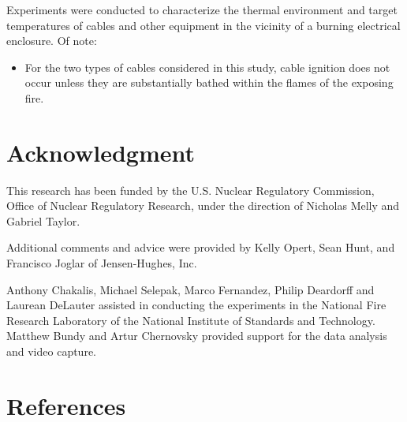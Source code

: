 Experiments were conducted to characterize the thermal environment and target temperatures of cables and other equipment in the vicinity of a burning electrical enclosure. Of note:
\begin{itemize}
\item For the two types of cables considered in this study, cable ignition does not occur unless they are substantially bathed within the flames of the exposing fire.
\end{itemize}



\section{Acknowledgment}

This research has been funded by the U.S. Nuclear Regulatory Commission, Office of Nuclear Regulatory Research, under the direction of Nicholas Melly and Gabriel Taylor.

Additional comments and advice were provided by Kelly Opert, Sean Hunt, and Francisco Joglar of Jensen-Hughes, Inc.

Anthony Chakalis, Michael Selepak, Marco Fernandez, Philip Deardorff and Laurean DeLauter assisted in conducting the experiments in the National Fire Research Laboratory of the National Institute of Standards and Technology. Matthew Bundy and Artur Chernovsky provided support for the data analysis and video capture.



\clearpage
\section*{References}






